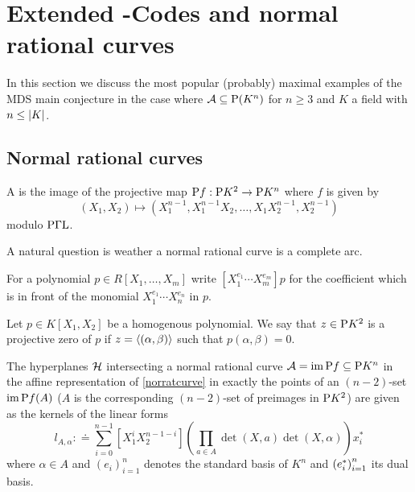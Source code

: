
\section{Extended -Codes and normal rational curves}

In this section we discuss the most popular (probably) maximal examples of the MDS main conjecture in the case where $\cA\setleq \P(K^n)$ for $n\geq 3$ and $K$ a field with $n\leq\left|K\right|$.

\subsection{Normal rational curves}

\begin{definition}\label{norratcurve}
    A  is the image of the projective map $\mathrm{P}{f}:\mathrm{P}{K^2}\rightarrow\mathrm{P}{K^n}$ where $f$ is given by
    $$
    (X_1,X_2) \mapsto (X_1^{n-1},X_1^{n-1}X_2,\ldots,X_1X_2^{n-1},X_2^{n-1})
    $$
    modulo $\mathrm{P\Gamma L}$.
\end{definition}

A natural question is weather a normal rational curve is a complete arc.

\begin{definition}
    For a polynomial $p\in R[X_1,\ldots,X_m]$ write $[X_1^{e_1}\cdots X_m^{e_m}]p$ for the coefficient which is in front of the monomial $X_1^{e_1}\cdots X_n^{e_n}$ in $p$.
\end{definition}

\begin{definition}
    Let $p\in K[X_1,X_2]$ be a homogenous polynomial. We say that $z\in\mathrm{P}{K^2}$ is a projective zero of $p$ if $z=\gen{(\alpha,\beta)}$ such that $p(\alpha,\beta)=0$. 
\end{definition}

\begin{lemma}\label{norrattandesc}
    The hyperplanes $\mathcal{H}$ intersecting a normal rational curve $\mathcal{A}=\mathop\mathrm{im}\mathrm{P}{f}\subseteq \mathrm{P}{K^n}$ in the affine representation of \autoref{norratcurve} in exactly the points of an $(n-2)$-set $\mathop\mathrm{im}\mathrm{P}{f}(A)$ ($A$ is the corresponding $(n-2)$-set of preimages in $\mathrm{P} K^2$) are given as the kernels of the linear forms 
    $$
    l_{A,\alpha}:\doteq\sum_{i=0}^{n-1}{[X_1^i X_2^{n-1-i}]\left(\prod_{a\in A}{\det(X,a)}\det(X,\alpha)\right)x_i^{\ast}}
    $$
    where $\alpha\in A$ and ${(e_i)}_{i=1}^n$ denotes the standard basis of $K^n$ and ${(e^{\ast}_i)}_{i=1}^n$ its dual basis.  
\end{lemma}

